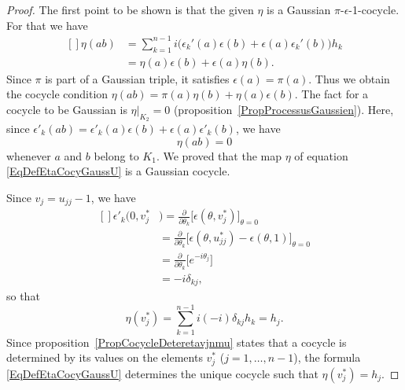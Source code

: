 \begin{proof}

	The first point to be shown is that the given $\eta$ is a Gaussian $\pi$-$\epsilon$-1-cocycle. For that we have
	\begin{equation}
		\begin{aligned}[]
			\eta(ab) & =\sum_{k=1}^{n-1}i\Big( \epsilon_k'(a)\epsilon(b)+\epsilon(a)\epsilon_k'(b) \Big)h_k \\
			         & =\eta(a)\epsilon(b)+\epsilon(a)\eta(b).
		\end{aligned}
	\end{equation}
	Since $\pi$ is part of a Gaussian triple, it satisfies $\epsilon(a)=\pi(a)$. Thus we obtain the cocycle condition $\eta(ab)=\pi(a)\eta(b)+\eta(a)\epsilon(b)$. The fact for a cocycle to be Gaussian is $\eta|_{K_2}=0$ (proposition~\ref{PropProcessusGaussien}). Here, since $\epsilon'_k(ab)=\epsilon'_k(a)\epsilon(b)+\epsilon(a)\epsilon'_k(b)$, we have
	\begin{equation}
		\eta(ab)=0
	\end{equation}
	whenever $a$ and $b$ belong to $K_1$. We proved that the map $\eta$ of equation \eqref{EqDefEtaCocyGaussU} is a Gaussian cocycle.

	Since $v_j=u_{jj}-1$, we have
	\begin{equation}
		\begin{aligned}[]
			\epsilon'_k(0,v_j^* & )=\frac{ \partial  }{ \partial \theta_k }\big[ \epsilon(\theta,v_j^*) \big]_{\theta=0}                      \\
			                    & =\frac{ \partial  }{ \partial \theta_k }\big[ \epsilon(\theta,u_{jj}^*)-\epsilon(\theta,1) \big]_{\theta=0} \\
			                    & =\frac{ \partial  }{ \partial \theta_k }\big[  e^{-i\theta_j} \big]                                         \\
			                    & =-i\delta_{kj},
		\end{aligned}
	\end{equation}
	so that
	\begin{equation}
		\eta(v_j^*)=\sum_{k=1}^{n-1}i(-i)\delta_{kj}h_k=h_j.
	\end{equation}
	Since proposition~\ref{PropCocycleDeteretavjnmu} states that a cocycle is determined by its values on the elements $v_j^*$ ($j=1,\ldots, n-1$), the formula \eqref{EqDefEtaCocyGaussU} determines the unique cocycle such that $\eta(v_j^*)=h_j$.
\end{proof}


